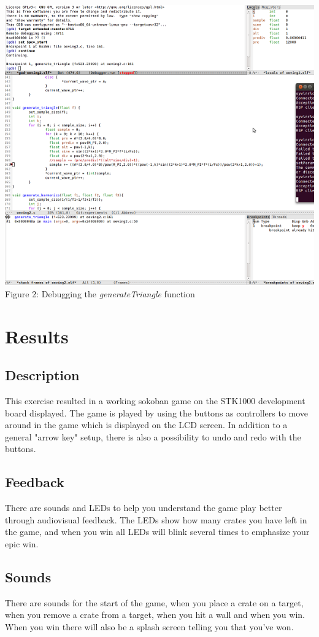 \documentclass[a4paper,11pt]{article}
\begin{document}
\begin{center}
\includegraphics{images/debugsmall.png}
Figure 2: Debugging the \emph{generateTriangle} function
\end{center}

\section{Results}
\subsection{Description} 

This exercise resulted in a working sokoban game on the STK1000 development board displayed. The game is played by using the buttons as controllers to move around in the game which is displayed on the LCD screen. In addition to a general "arrow key" setup, there is also a possibility to undo and redo with the buttons. 

\subsection{Feedback}There are sounds and LEDs to help you understand the game play better through audiovisual feedback. The LEDs show how many crates you have left in the game, and when you win all LEDs will blink several times to emphasize your epic win.

\subsection{Sounds}There are sounds for the start of the game, when you place a crate on a target, when you remove a crate from a target, when you hit a wall and when you win. When you win there will also be a splash screen telling you that you've won. 
\end{document}
